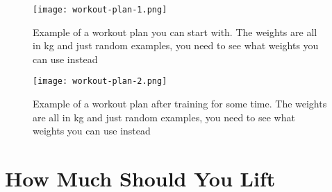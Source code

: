 \documentclass[openany, 12pt]{book}
\begin{document}
	\begin{figure}[h]
		\centering
		\texttt{[image: workout-plan-1.png]}
		\caption{Example of a workout plan you can start with. The weights are all in kg and just random examples, you need to see what weights you can use instead}
		\label{fig12}
	\end{figure}

	\begin{figure}[h]
		\centering
		\texttt{[image: workout-plan-2.png]}
		\caption{Example of a workout plan after training for some time. The weights are all in kg and just random examples, you need to see what weights you can use instead}
		\label{fig13}
	\end{figure}

        \section{How Much Should You Lift}
\end{document}
